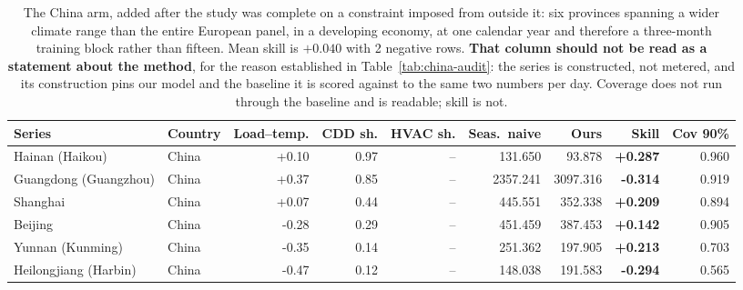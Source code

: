 \begin{table}[t]
\centering
\footnotesize
\setlength{\tabcolsep}{3.5pt}
\begin{tabular}{llrrrrrrr}
\toprule
Series & Country & Load--temp. & CDD sh. & HVAC sh. & Seas.\ naive & Ours & Skill & Cov 90\% \\
\midrule
Hainan (Haikou) & China & +0.10 & 0.97 & -- & 131.650 & 93.878 & \textbf{+0.287} & 0.960 \\
Guangdong (Guangzhou) & China & +0.37 & 0.85 & -- & 2357.241 & 3097.316 & \textbf{-0.314} & 0.919 \\
Shanghai & China & +0.07 & 0.44 & -- & 445.551 & 352.338 & \textbf{+0.209} & 0.894 \\
Beijing & China & -0.28 & 0.29 & -- & 451.459 & 387.453 & \textbf{+0.142} & 0.905 \\
Yunnan (Kunming) & China & -0.35 & 0.14 & -- & 251.362 & 197.905 & \textbf{+0.213} & 0.703 \\
Heilongjiang (Harbin) & China & -0.47 & 0.12 & -- & 148.038 & 191.583 & \textbf{-0.294} & 0.565 \\
\bottomrule
\end{tabular}
\caption{The China arm, added after the study was complete on a constraint imposed from outside it: six provinces spanning a wider climate range than the entire European panel, in a developing economy, at one calendar year and therefore a three-month training block rather than fifteen. Mean skill is $+0.040$ with 2 negative rows. \textbf{That column should not be read as a statement about the method}, for the reason established in Table~\ref{tab:china-audit}: the series is constructed, not metered, and its construction pins our model and the baseline it is scored against to the same two numbers per day. Coverage does not run through the baseline and is readable; skill is not.}
\label{tab:china}
\end{table}
